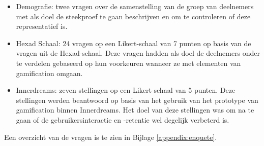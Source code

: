 \begin{itemize}
    \item Demografie: twee vragen over de samenstelling van de groep van deelnemers met als doel de steekproef te gaan beschrijven en om te controleren of deze representatief is.
    \item Hexad Schaal: 24 vragen op een Likert-schaal van 7 punten op basis van de vragen uit de Hexad-schaal. Deze vragen hadden als doel de deelnemers onder te verdelen gebaseerd op hun voorkeuren wanneer ze met elementen van gamification omgaan.
    \item Innerdreams: zeven stellingen op een Likert-schaal van 5 punten. Deze stellingen werden beantwoord op basis van het gebruik van het prototype van gamification binnen Innerdreams. Het doel van deze stellingen was om na te gaan of de gebruikersinteractie en -retentie wel degelijk verbeterd is.
\end{itemize}

Een overzicht van de vragen is te zien in Bijlage \ref{appendix:enquete}.
